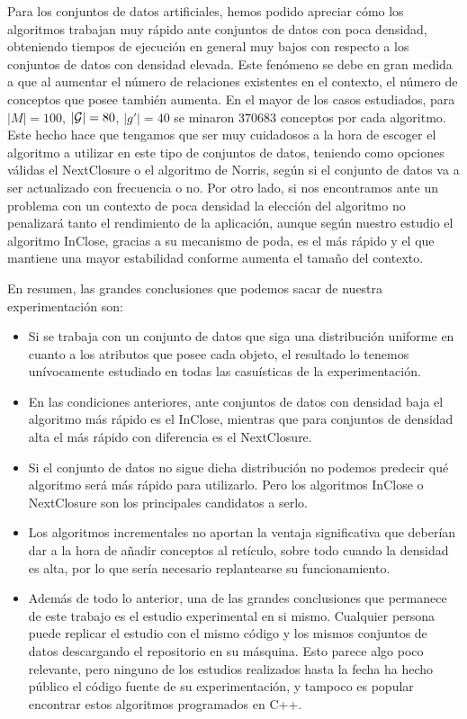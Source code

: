 \documentclass[oneside,openright,titlepage,numbers=noenddot,openany,headinclude,footinclude=true,
cleardoublepage=empty,abstractoff,BCOR=5mm,paper=a4,fontsize=12pt,main=spanish]{scrreprt}
\begin{document}
Para los conjuntos de datos artificiales, hemos podido apreciar cómo los algoritmos trabajan muy rápido ante conjuntos de datos con poca densidad, obteniendo tiempos de ejecución en general muy bajos con respecto a los conjuntos de datos con densidad elevada. Este fenómeno se debe en gran medida a que al aumentar el número de relaciones existentes en el contexto, el número de conceptos que posee también aumenta. En el mayor de los casos estudiados, para $|M|=100$, $|\mathcal{G}|=80$, $|g'|=40$ se minaron $370683$ conceptos por cada algoritmo. Este hecho hace que tengamos que ser muy cuidadosos a la hora de escoger el algoritmo a utilizar en este tipo de conjuntos de datos, teniendo como opciones válidas el NextClosure o el algoritmo de Norris, según si el conjunto de datos va a ser actualizado con frecuencia o no. Por otro lado, si nos encontramos ante un problema con un contexto de poca densidad la elección del algoritmo no penalizará tanto el rendimiento de la aplicación, aunque según nuestro estudio el algoritmo InClose, gracias a su mecanismo de poda, es el más rápido y el que mantiene una mayor estabilidad conforme aumenta el tamaño del contexto.

En resumen, las grandes conclusiones que podemos sacar de nuestra experimentación son:

\begin{itemize}
    \item Si se trabaja con un conjunto de datos que siga una distribución uniforme en cuanto a los atributos que posee cada objeto, el resultado lo tenemos unívocamente estudiado en todas las casuísticas de la experimentación.
    \item En las condiciones anteriores, ante conjuntos de datos con densidad baja el algoritmo más rápido es el InClose, mientras que para conjuntos de densidad alta el más rápido con diferencia es el NextClosure.
    \item Si el conjunto de datos no sigue dicha distribución no podemos predecir qué algoritmo será más rápido para utilizarlo. Pero los algoritmos InClose o NextClosure son los principales candidatos a serlo.
    \item Los algoritmos incrementales no aportan la ventaja significativa que deberían dar a la hora de añadir conceptos al retículo, sobre todo cuando la densidad es alta, por lo que sería necesario replantearse su funcionamiento.
    \item Además de todo lo anterior, una de las grandes conclusiones que permanece de este trabajo es el estudio experimental en si mismo. Cualquier persona puede replicar el estudio con el mismo código y los mismos conjuntos de datos descargando el repositorio en su másquina. Esto parece algo poco relevante, pero ninguno de los estudios realizados hasta la fecha ha hecho público el código fuente de su experimentación, y tampoco es popular encontrar estos algoritmos programados en C++.
\end{itemize}
\end{document}
